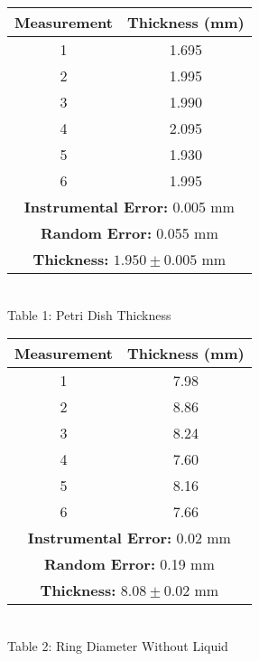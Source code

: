 \begin{center}
    \begin{minipage}{.5\linewidth}
        \centering
        \begin{tabular}{|c | c|}
            \hline
            \textbf{Measurement} & \textbf{Thickness (mm)}  \\ \hline
            1 & 1.695 \\ 
            2 & 1.995 \\ 
            3 & 1.990  \\ 
            4 & 2.095 \\ 
            5 & 1.930 \\ 
            6 & 1.995 \\ \hline
            \multicolumn{2}{|c|}{\textbf{Instrumental Error:} 0.005 mm} \\
            \multicolumn{2}{|c|}{\textbf{Random Error:} 0.055 mm} \\
            \multicolumn{2}{|c|}{\textbf{Thickness:} $1.950\pm0.005$ mm} \\ \hline
        \end{tabular}
        \vspace{3mm}
        \\Table 1: Petri Dish Thickness
        \vspace{10mm}
    \end{minipage}%
    \begin{minipage}{.5\linewidth}
        \centering
        \begin{tabular}{|c | c|}
            \hline
            \textbf{Measurement} & \textbf{Thickness (mm)}  \\ \hline
            1 & 7.98 \\ 
            2 & 8.86 \\ 
            3 & 8.24  \\ 
            4 & 7.60 \\ 
            5 & 8.16 \\ 
            6 & 7.66 \\ \hline
            \multicolumn{2}{|c|}{\textbf{Instrumental Error:} 0.02 mm} \\
            \multicolumn{2}{|c|}{\textbf{Random Error:} 0.19 mm} \\
            \multicolumn{2}{|c|}{\textbf{Thickness:} $8.08\pm0.02$ mm} \\ \hline
        \end{tabular}
        \vspace{3mm}
        \\Table 2: Ring Diameter Without Liquid

\end{minipage}
\end{center}
